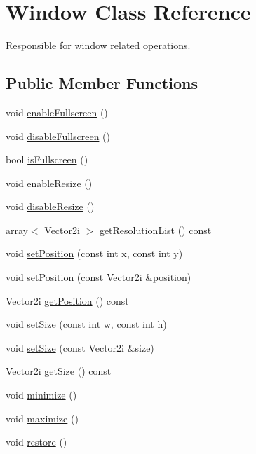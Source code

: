 \hypertarget{class_window}{\section{Window Class Reference}
\label{class_window}
}


Responsible for window related operations.  


\subsection*{Public Member Functions}
\begin{DoxyCompactItemize}
\item 
void \hyperlink{class_window_a11d04c69f1ed262f55818dcd3148d96e}{enable\+Fullscreen} ()
\item 
void \hyperlink{class_window_ae63476a624f22a8e6570257503c942dd}{disable\+Fullscreen} ()
\item 
bool \hyperlink{class_window_a09601411d5da2b4fc85ac1a38820355f}{is\+Fullscreen} ()
\item 
void \hyperlink{class_window_a9cbb8b625751c29026613d9dd8356951}{enable\+Resize} ()
\item 
void \hyperlink{class_window_a8ce4538550692b4b3be9e1ea032af747}{disable\+Resize} ()
\item 
array$<$ Vector2i $>$ \hyperlink{class_window_abbe7ba6b0d1eae7ed13c2a168bba216e}{get\+Resolution\+List} () const 
\item 
void \hyperlink{class_window_a6ee7f17bbb8ec7aa32c308092477ff66}{set\+Position} (const int x, const int y)
\item 
void \hyperlink{class_window_a85fec7579c4b86beaa672e4a257341eb}{set\+Position} (const Vector2i \&position)
\item 
Vector2i \hyperlink{class_window_af446711ecf618cf2c396e24382827504}{get\+Position} () const 
\item 
void \hyperlink{class_window_a645f0139f745c3134c75a2314eae00bd}{set\+Size} (const int w, const int h)
\item 
void \hyperlink{class_window_a751085219540e80aaaba49e56cc2060d}{set\+Size} (const Vector2i \&size)
\item 
Vector2i \hyperlink{class_window_add88acca2cb99db823def25c03d84ba3}{get\+Size} () const 
\item 
void \hyperlink{class_window_a85ffaebe489c0ecf8051715ecf59babb}{minimize} ()
\item 
void \hyperlink{class_window_a1aa481996525792213f28d91fbb4894b}{maximize} ()
\item 
void \hyperlink{class_window_afd3595051be2709847c2de4352f27cf5}{restore} ()
\end{DoxyCompactItemize}


